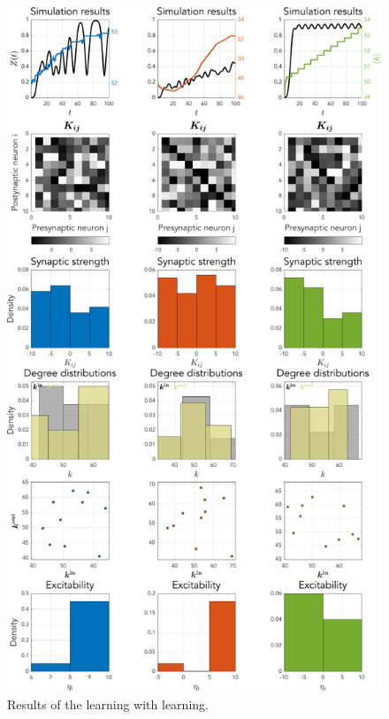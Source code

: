 \begin{figure}[H]
\centering
\includegraphics[height = \textheight]{../Figures/Learning/STDPandIP.pdf}
\caption{Results of the \STDP learning with \IP learning.}
\label{fig:STDP}
\end{figure}



